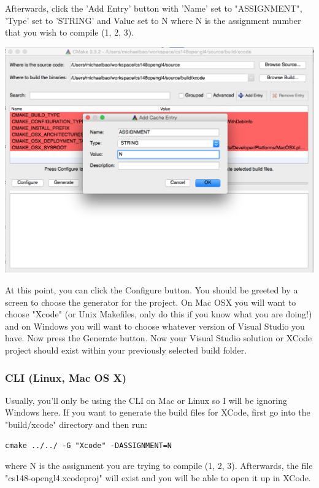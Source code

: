 \documentclass{article}
\begin{document}
Afterwards, click the 'Add Entry' button with 'Name' set to "ASSIGNMENT", 'Type' set to 'STRING' and Value set to N where N is the assignment number that you wish to compile (1, 2, 3).

\includegraphics[width=\linewidth]{cmake2.png}

At this point, you can click the Configure button. You should be greeted by a screen to choose the generator for the project. On Mac OSX you will want to choose "Xcode" (or Unix Makefiles, only do this if you know what you are doing!) and on Windows you will want to choose whatever version of Visual Studio you have. Now press the Generate button. Now your Visual Studio solution or XCode project should exist within your previously selected build folder.

\subsubsection*{CLI (Linux, Mac OS X)}

Usually, you'll only be using the CLI on Mac or Linux so I will be ignoring Windows here. If you want to generate the build files for XCode, first go into the "build/xcode" directory and then run: 

\begin{lstlisting}
cmake ../../ -G "Xcode" -DASSIGNMENT=N
\end{lstlisting}

where N is the assignment you are trying to compile (1, 2, 3). Afterwards, the file "cs148-opengl4.xcodeproj" will exist and you will be able to open it up in XCode.
\end{document}
